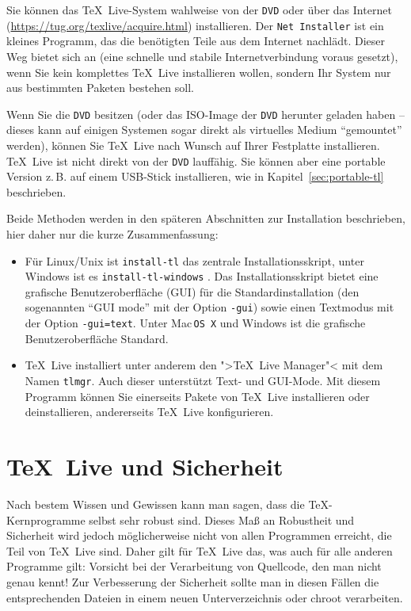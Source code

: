 \documentclass[12pt,ngerman,a4paper,fullparskip]{report}
\newcommand{\TL}{\TeX\ Live\xspace}
\newcommand{\acro}[1]{\texttt{#1}}
\newcommand{\cmdname}[1]{\texttt{#1}}
\newcommand{\code}[1]{\texttt{#1}}
\newcommand{\prog}[1]{\texttt{#1}}
\providecommand*{\DVD}{\acro{DVD}\xspace}
\providecommand*{\MacOSX}{Mac\,\acro{OS\,X}\xspace}
\begin{document}
Sie können das \TL-System wahlweise von der \DVD oder über das
Internet (\url{https://tug.org/texlive/acquire.html}) installieren.
Der \prog{Net Installer} ist ein kleines Programm,
das die benötigten Teile aus dem Internet nachlädt. Dieser Weg bietet
sich an (eine schnelle und stabile Internetverbindung voraus gesetzt),
wenn Sie kein komplettes \TL{} installieren wollen, sondern Ihr System nur
aus bestimmten Paketen bestehen soll.

Wenn Sie die \DVD{} besitzen (oder das ISO-Image der \DVD{} herunter
geladen haben -- dieses kann auf einigen Systemen sogar direkt als
virtuelles Medium \enquote{gemountet} werden), können Sie \TL{} nach
Wunsch auf Ihrer Festplatte installieren. \TL{} ist nicht direkt von der \DVD{} lauffähig. Sie können aber eine portable Version z.\,B. auf einem USB-Stick installieren, wie in Kapitel~\ref{sec:portable-tl} beschrieben.

Beide Methoden werden in den späteren Abschnitten zur Installation beschrieben, hier daher nur die kurze Zusammenfassung:

\begin{itemize}
\item Für Linux/Unix ist \cmdname{install-tl} das zentrale Installationsskript, unter Windows ist es \cmdname{install-tl-windows}  . Das Installationsskript bietet eine grafische Benutzeroberfläche (GUI) für die Standardinstallation  (den sogenannten \enquote{GUI mode} mit der Option \code{-gui}) sowie einen  Textmodus  mit der Option \code{-gui=text}. Unter \MacOSX und Windows ist die grafische Benutzeroberfläche Standard. 

\item \TL installiert unter anderem den ">\TL Manager"< mit dem Namen
\prog{tlmgr}. Auch dieser unterstützt Text- und GUI-Mode. Mit diesem
Programm können Sie einerseits Pakete von \TL installieren oder deinstallieren,
andererseits \TL konfigurieren.
\end{itemize}

\section{\TL und Sicherheit}

Nach bestem Wissen und Gewissen kann man sagen, dass die \TeX-Kernprogramme selbst sehr robust sind. Dieses Maß an Robustheit und Sicherheit wird jedoch möglicherweise nicht von allen Programmen erreicht, die Teil von \TL sind. Daher gilt für \TL das, was auch für alle anderen Programme gilt: Vorsicht bei der Verarbeitung von Quellcode, den man nicht genau kennt! Zur Verbesserung der Sicherheit sollte man in diesen Fällen die entsprechenden Dateien in einem neuen Unterverzeichnis oder chroot verarbeiten.
\end{document}
